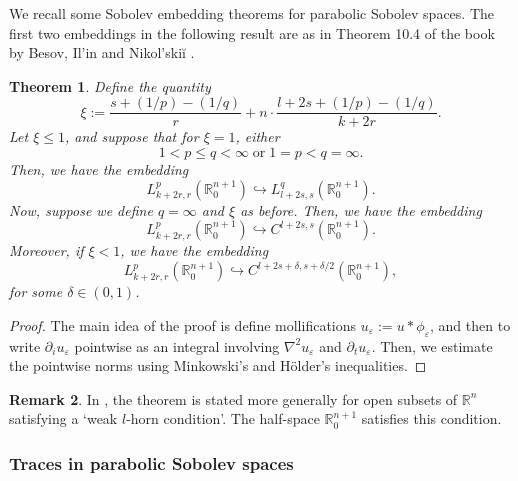 \documentclass[10pt, a4paper]{article}
\theoremstyle{plain}%
\newtheorem{theorem}{Theorem}[section]
\theoremstyle{definition}
\newtheorem{rem}[theorem]{Remark}
\numberwithin{figure}{section}
\numberwithin{equation}{section}
\newcommand{\bR}{\mathbb{R}}
\newcommand{\pa}{\partial}
\newcommand{\ep}{\varepsilon}
\begin{document}
We recall some Sobolev embedding theorems for parabolic Sobolev spaces. The first two embeddings in the following result are as in Theorem 10.4 of the book by Besov, Il'in and Nikol'skiĭ \cite{BIN78}. 
\begin{theorem}\label{thm_sobolevembeddingparabolic}
	Define the quantity 
	\begin{equation}\label{eq_parabolicembeddingparameter}
	\xi:= \frac{s+(1/p)-(1/q)}{r}+n\cdot \frac{l+2s+(1/p)-(1/q)}{k+2r}.
	\end{equation}
	Let $\xi\leq 1$, and suppose that for $\xi=1$, either
	\[
	1<p\leq q <\infty\; \mathrm{ or }\; 1=p<q=\infty.
	\]
	Then, we have the embedding 
	\begin{equation}\label{eq_parabolicsobolevembedding}
	L^p_{k+2r,r}(\bR^{n+1}_0) \hookrightarrow L^q_{l+2s,s}(\bR^{n+1}_0).
	\end{equation}
	Now, suppose we define $q=\infty$ and $\xi$ as before. Then, we have the embedding 
	\begin{equation}\label{eq_parabolicckembedding}
	L^p_{k+2r,r}(\bR^{n+1}_0)\hookrightarrow C^{l+2s,s}(\bR^{n+1}_0).
	\end{equation}
	Moreover, if $\xi <1$, we have the embedding
	\begin{equation}\label{eq_parabolicholderembedding}
	L^p_{k+2r,r}(\bR^{n+1}_0)\hookrightarrow C^{l+2s+\delta,s+\delta/2}(\bR^{n+1}_0),
	\end{equation}
	for some $\delta\in(0,1)$.
	
\end{theorem}

\begin{proof}
	The main idea of the proof is define mollifications $u_\ep:= u *\phi_\ep$, and then to write $\pa_iu_\ep$ pointwise as an integral involving $\nabla^2u_\ep$ and $\pa_t u_\ep$. Then, we estimate the pointwise norms using Minkowski's and H\"{o}lder's inequalities. 
\end{proof}

\begin{rem}
	In \cite{BIN78}, the theorem is stated more generally for open subsets of $\bR^n$ satisfying a `weak $l$-horn condition'. The half-space $\bR^{n+1}_0$ satisfies this condition.
\end{rem}


\subsubsection{Traces in parabolic Sobolev spaces}
\end{document}
